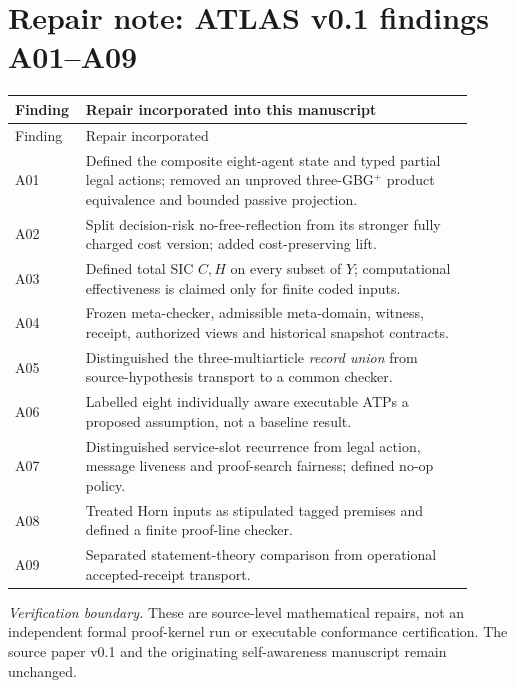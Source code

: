 \documentclass[10pt,letterpaper]{article}
\theoremstyle{remark}\newtheorem{remark}[definition]{Remark}
\begin{document}
\begin{center}
\end{center}

\section*{Repair note: ATLAS v0.1 findings A01--A09}
\begin{longtable}{@{}p{0.11\linewidth}p{0.80\linewidth}@{}}
\toprule Finding & Repair incorporated into this manuscript\\\midrule\endfirsthead
\toprule Finding & Repair incorporated\\\midrule\endhead
A01 & Defined the composite eight-agent state and typed partial legal actions; removed an unproved three-GBG$^+$ product equivalence and bounded passive projection.\\
A02 & Split decision-risk no-free-reflection from its stronger fully charged cost version; added cost-preserving lift.\\
A03 & Defined total SIC $C,H$ on every subset of $Y$; computational effectiveness is claimed only for finite coded inputs.\\
A04 & Frozen meta-checker, admissible meta-domain, witness, receipt, authorized views and historical snapshot contracts.\\
A05 & Distinguished the three-multiarticle \emph{record union} from source-hypothesis transport to a common checker.\\
A06 & Labelled eight individually aware executable ATPs a proposed assumption, not a baseline result.\\
A07 & Distinguished service-slot recurrence from legal action, message liveness and proof-search fairness; defined no-op policy.\\
A08 & Treated Horn inputs as stipulated tagged premises and defined a finite proof-line checker.\\
A09 & Separated statement-theory comparison from operational accepted-receipt transport.\\
\bottomrule
\end{longtable}
\noindent\textit{Verification boundary.} These are source-level mathematical repairs, not an independent formal proof-kernel run or executable conformance certification. The source paper v0.1 and the originating self-awareness manuscript remain unchanged.
\end{document}
